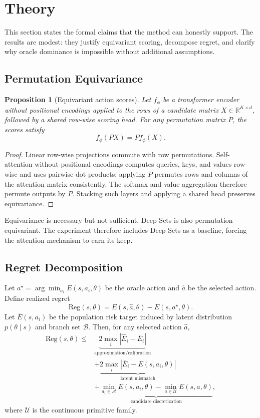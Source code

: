 \documentclass{article}
\newtheorem{proposition}{Proposition}
\newcommand{\actionset}{\mathcal{A}}
\newcommand{\latent}{\theta}
\newcommand{\energy}{E}
\begin{document}
\section{Theory}

This section states the formal claims that the method can honestly support.  The results are modest: they justify equivariant scoring, decompose regret, and clarify why oracle dominance is impossible without additional assumptions.

\subsection{Permutation Equivariance}

\begin{proposition}[Equivariant action scores]
Let $f_\phi$ be a transformer encoder without positional encodings applied to the rows of a candidate matrix $X \in \mathbb{R}^{K \times d}$, followed by a shared row-wise scoring head.  For any permutation matrix $P$, the scores satisfy
\[
  f_\phi(PX) = P f_\phi(X).
\]
\end{proposition}

\begin{proof}
Linear row-wise projections commute with row permutations.  Self-attention without positional encodings computes queries, keys, and values row-wise and uses pairwise dot products; applying $P$ permutes rows and columns of the attention matrix consistently.  The softmax and value aggregation therefore permute outputs by $P$.  Stacking such layers and applying a shared head preserves equivariance.
\end{proof}

Equivariance is necessary but not sufficient.  Deep Sets is also permutation equivariant.  The experiment therefore includes Deep Sets as a baseline, forcing the attention mechanism to earn its keep.

\subsection{Regret Decomposition}

Let $a^\star = \arg\min_{a_i}\energy(s,a_i,\latent)$ be the oracle action and $\hat{a}$ be the selected action.  Define realized regret
\[
  \mathrm{Reg}(s,\latent) = \energy(s,\hat{a},\latent)-\energy(s,a^\star,\latent).
\]
Let $\bar{\energy}(s,a_i)$ be the population risk target induced by latent distribution $p(\latent \mid s)$ and branch set $\mathcal{B}$.  Then, for any selected action $\hat a$,
\[
\begin{aligned}
  \mathrm{Reg}(s,\latent)
  \leq
  &\underbrace{2\max_i |\widehat{\energy}_i-\bar{\energy}_i|}_{\text{approximation/calibration}}\\
  &+
  \underbrace{2\max_i |\bar{\energy}_i-\energy(s,a_i,\latent)|}_{\text{latent mismatch}}\\
  &+
  \underbrace{\min_{a_i \in \actionset}\energy(s,a_i,\latent)-\min_{a \in \mathcal{U}}\energy(s,a,\latent)}_{\text{candidate discretization}},
\end{aligned}
\]
where $\mathcal{U}$ is the continuous primitive family.
\end{document}
